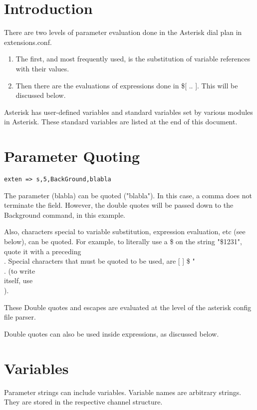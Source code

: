 \section{Introduction}

There are two levels of parameter evaluation done in the Asterisk
dial plan in extensions.conf.
\begin{enumerate}
\item The first, and most frequently used, is the substitution of variable
  references with their values. 
\item Then there are the evaluations of expressions done in \$[ .. ]. 
  This will be discussed below.
\end{enumerate}
Asterisk has user-defined variables and standard variables set
by various modules in Asterisk. These standard variables are
listed at the end of this document.

\section{Parameter Quoting}
\begin{verbatim}
exten => s,5,BackGround,blabla
\end{verbatim}
The parameter (blabla) can be quoted ("blabla"). In this case, a 
comma does not terminate the field. However, the double quotes
will be passed down to the Background command, in this example.

Also, characters special to variable substitution, expression evaluation, etc
(see below), can be quoted. For example, to literally use a \$ on the 
string "\$1231", quote it with a preceding \\. Special characters that must
be quoted to be used, are [ ] \$ " \\. (to write \\ itself, use \\). 

These Double quotes and escapes are evaluated at the level of the
asterisk config file parser. 

Double quotes can also be used inside expressions, as discussed below.

\section{Variables}

Parameter strings can include variables. Variable names are arbitrary strings. 
They are stored in the respective channel structure. 

